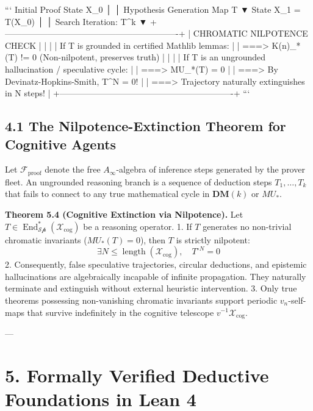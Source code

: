\documentclass[11pt,twoside,openright]{amsbook}
\begin{document}
```
   Initial Proof State X_0
              │
              │  Hypothesis Generation Map T
              ▼
   State X_1 = T(X_0)
              │
              │  Search Iteration: T^{\circ k}
              ▼
   +-------------------------------------------------------------+
   |                CHROMATIC NILPOTENCE CHECK                   |
   |                                                             |
   |   If T is grounded in certified Mathlib lemmas:             |
   |     ===> K(n)_*(T) != 0  (Non-nilpotent, preserves truth)   |
   |                                                             |
   |   If T is an ungrounded hallucination / speculative cycle:  |
   |     ===> MU_*(T) = 0                                        |
   |     ===> By Devinatz-Hopkins-Smith, T^{\circ N} = 0!        |
   |     ===> Trajectory naturally extinguishes in N steps!      |
   +-------------------------------------------------------------+
```

\subsection{4.1 The Nilpotence-Extinction Theorem for Cognitive Agents}
Let $\mathcal{F}_{\text{proof}}$ denote the free $A_\infty$-algebra of inference steps generated by the prover fleet. An ungrounded reasoning branch is a sequence of deduction steps $T_1, \dots, T_k$ that fails to connect to any true mathematical cycle in $\mathbf{DM}(k)$ or $MU_*$.

\textbf{Theorem 5.4 (Cognitive Extinction via Nilpotence).} Let $T \in \operatorname{End}_{\mathcal{Sp}}^*(\mathcal{X}_{\text{cog}})$ be a reasoning operator.
1. If $T$ generates no non-trivial chromatic invariants ($MU_*(T) = 0$), then $T$ is strictly nilpotent:
   $$\exists N \leq \operatorname{length}(\mathcal{X}_{\text{cog}}), \quad T^{\circ N} = 0$$
2. Consequently, false speculative trajectories, circular deductions, and epistemic hallucinations are algebraically incapable of infinite propagation. They naturally terminate and extinguish without external heuristic intervention.
3. Only true theorems possessing non-vanishing chromatic invariants support periodic $v_n$-self-maps that survive indefinitely in the cognitive telescope $v^{-1} \mathcal{X}_{\text{cog}}$.

---

\section{5. Formally Verified Deductive Foundations in Lean 4}
\end{document}
